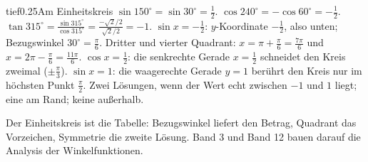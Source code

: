 \begin{loesungkarte}{tief}{0.25}{Am Einheitskreis}
$\sin150^{\circ} = \sin30^{\circ} = \frac12$. $\cos240^{\circ} = -\cos60^{\circ} = -\frac12$. $\tan315^{\circ} = \frac{\sin315^{\circ}}{\cos315^{\circ}} = \frac{-\sqrt2/2}{\sqrt2/2} = -1$.
$\sin x = -\frac12$: $y$-Koordinate $-\frac12$, also unten; Bezugswinkel $30^{\circ} = \frac\pi6$. Dritter und vierter Quadrant: $x = \pi + \frac\pi6 = \frac{7\pi}6$ und $x = 2\pi - \frac\pi6 = \frac{11\pi}6$.
$\cos x = \frac12$: die senkrechte Gerade $x = \frac12$ schneidet den Kreis zweimal ($\pm\frac\pi3$). $\sin x = 1$: die waagerechte Gerade $y = 1$ berührt den Kreis nur im höchsten Punkt $\frac\pi2$. Zwei Lösungen, wenn der Wert echt zwischen $-1$ und $1$ liegt; eine am Rand; keine außerhalb.
\begin{center}
\end{center}
\begin{mitnehmen}\kastentext
Der Einheitskreis ist die Tabelle: Bezugswinkel liefert den Betrag, Quadrant das Vorzeichen, Symmetrie die zweite Lösung. Band 3 und Band 12 bauen darauf die Analysis der Winkelfunktionen.
\end{mitnehmen}
\end{loesungkarte}

